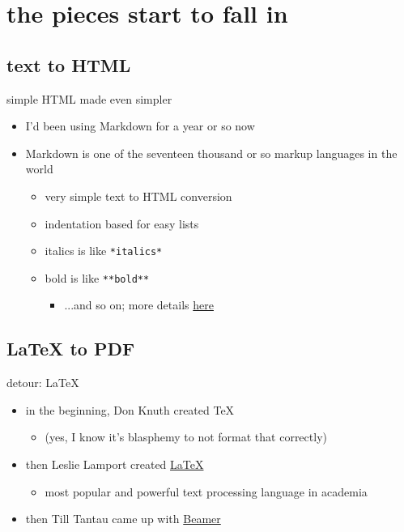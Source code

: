 \documentclass{beamer}
\begin{document}
\section{the pieces start to fall in}

\subsection{text to HTML}

\begin{frame}{simple HTML made even simpler}

\begin{itemize}
\item
I'd been using Markdown for a year or so now
\item
Markdown is one of the seventeen thousand or so markup languages in the
world
\begin{itemize}
\item
very simple text to HTML conversion
\item
indentation based for easy lists
\item
italics is like \texttt{*italics*}
\item
bold is like \texttt{**bold**}
\begin{itemize}
\item
...and so on; more details
\href{http://daringfireball.net/projects/markdown/}{here}
\end{itemize}
\end{itemize}
\end{itemize}



\end{frame}

\subsection{LaTeX to PDF}

\begin{frame}{detour: LaTeX}

\begin{itemize}
\item
in the beginning, Don Knuth created TeX
\begin{itemize}
\item
(yes, I know it's blasphemy to not format that correctly)
\end{itemize}
\item
then Leslie Lamport created \href{http://www.latex-project.org/}{LaTeX}
\begin{itemize}
\item
most popular and powerful text processing language in academia
\end{itemize}
\item
then Till Tantau came up with
\href{http://latex-beamer.sourceforge.net/}{Beamer}
\end{itemize}



\end{frame}
\end{document}
